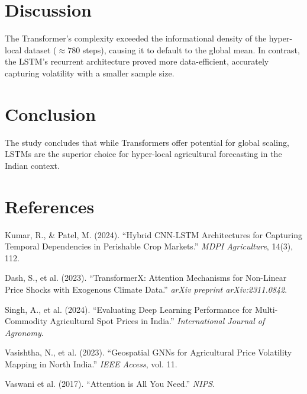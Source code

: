 \documentclass[11pt, a4paper]{article}
\begin{document}
\section{Discussion}
The Transformer's complexity exceeded the informational density of the hyper-local dataset ($\approx 780$ steps), causing it to default to the global mean. In contrast, the LSTM’s recurrent architecture proved more data-efficient, accurately capturing volatility with a smaller sample size.

\section{Conclusion}
The study concludes that while Transformers offer potential for global scaling, LSTMs are the superior choice for hyper-local agricultural forecasting in the Indian context.

\section*{References}
\begin{enumerate}[label={[\arabic*]}]
    \item Kumar, R., \& Patel, M. (2024). ``Hybrid CNN-LSTM Architectures for Capturing Temporal Dependencies in Perishable Crop Markets.'' \textit{MDPI Agriculture}, 14(3), 112.
    \item Dash, S., et al. (2023). ``TransformerX: Attention Mechanisms for Non-Linear Price Shocks with Exogenous Climate Data.'' \textit{arXiv preprint arXiv:2311.0842}.
    \item Singh, A., et al. (2024). ``Evaluating Deep Learning Performance for Multi-Commodity Agricultural Spot Prices in India.'' \textit{International Journal of Agronomy}.
    \item Vasishtha, N., et al. (2023). ``Geospatial GNNs for Agricultural Price Volatility Mapping in North India.'' \textit{IEEE Access}, vol. 11.
    \item Vaswani et al. (2017). ``Attention is All You Need.'' \textit{NIPS}.
\end{enumerate}
\end{document}
